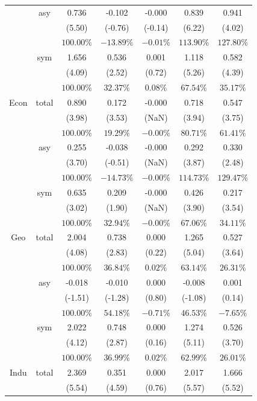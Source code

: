 \documentclass[
]{article}
\begin{document}
\begin{table}[H]
{\begin{tabular}{ccccccc}
   & asy & 0.736 & -0.102 & -0.000 & 0.839 & 0.941 \\ 
   &  & (5.50) & (-0.76) & (-0.14) & (6.22) & (4.02) \\ 
   &  & $100.00\%$ & $-13.89\%$ & $-0.01\%$ & $113.90\%$ & $127.80\%$ \\ 
   & sym & 1.656 & 0.536 & 0.001 & 1.118 & 0.582 \\ 
   &  & (4.09) & (2.52) & (0.72) & (5.26) & (4.39) \\ 
   &  & $100.00\%$ & $32.37\%$ & $0.08\%$ & $67.54\%$ & $35.17\%$ \\ 
   \hline 
Econ & total & 0.890 & 0.172 & -0.000 & 0.718 & 0.547 \\ 
   &  & (3.98) & (3.53) & (NaN) & (3.94) & (3.75) \\ 
   &  & $100.00\%$ & $19.29\%$ & $-0.00\%$ & $80.71\%$ & $61.41\%$ \\ 
   & asy & 0.255 & -0.038 & -0.000 & 0.292 & 0.330 \\ 
   &  & (3.70) & (-0.51) & (NaN) & (3.87) & (2.48) \\ 
   &  & $100.00\%$ & $-14.73\%$ & $-0.00\%$ & $114.73\%$ & $129.47\%$ \\ 
   & sym & 0.635 & 0.209 & -0.000 & 0.426 & 0.217 \\ 
   &  & (3.02) & (1.90) & (NaN) & (3.90) & (3.54) \\ 
   &  & $100.00\%$ & $32.94\%$ & $-0.00\%$ & $67.06\%$ & $34.11\%$ \\ 
   \hline 
Geo & total & 2.004 & 0.738 & 0.000 & 1.265 & 0.527 \\ 
   &  & (4.08) & (2.83) & (0.22) & (5.04) & (3.64) \\ 
   &  & $100.00\%$ & $36.84\%$ & $0.02\%$ & $63.14\%$ & $26.31\%$ \\ 
   & asy & -0.018 & -0.010 & 0.000 & -0.008 & 0.001 \\ 
   &  & (-1.51) & (-1.28) & (0.80) & (-1.08) & (0.14) \\ 
   &  & $100.00\%$ & $54.18\%$ & $-0.71\%$ & $46.53\%$ & $-7.65\%$ \\ 
   & sym & 2.022 & 0.748 & 0.000 & 1.274 & 0.526 \\ 
   &  & (4.12) & (2.87) & (0.16) & (5.11) & (3.70) \\ 
   &  & $100.00\%$ & $36.99\%$ & $0.02\%$ & $62.99\%$ & $26.01\%$ \\ 
   \hline 
Indu & total & 2.369 & 0.351 & 0.000 & 2.017 & 1.666 \\ 
   &  & (5.54) & (4.59) & (0.76) & (5.57) & (5.52) \\ 

\end{tabular}}
\end{table}
\end{document}
